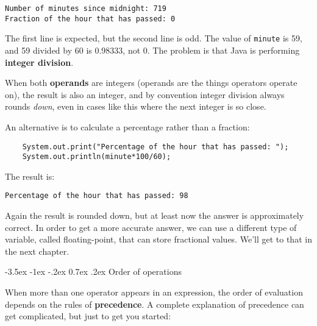 \documentclass{book}
\makeatletter
\renewcommand{\section}{\@startsection 
    {section} {1} {0mm}%
    {-3.5ex \@plus -1ex \@minus -.2ex}%
    {0.7ex \@plus.2ex}%
    {\normalfont\Large\bfseries}}
\makeatother
\begin{document}
\begin{verbatim}
Number of minutes since midnight: 719
Fraction of the hour that has passed: 0
\end{verbatim}
%
The first line is expected, but the second line is
odd.  The value of {\tt minute} is 59, and
59 divided by 60 is 0.98333, not 0.  The problem is that
Java is performing {\bf integer division}.


When both {\bf operands} are integers (operands are the things
operators operate on), the result is also an integer,
and by convention integer division always rounds {\em down},
even in cases like this where the next integer is so close.

An alternative is to calculate a percentage
rather than a fraction:

\begin{verbatim}
    System.out.print("Percentage of the hour that has passed: ");
    System.out.println(minute*100/60);
\end{verbatim}
%
The result is:

\begin{verbatim}
Percentage of the hour that has passed: 98
\end{verbatim}
%
Again the result is rounded down, but at least now the answer
is approximately correct.  In order to get a more accurate
answer, we can use a different type of variable, called
floating-point, that can store fractional values.
We'll get to that in the next chapter.


\section{Order of operations}

When more than one operator appears in an expression, the order
of evaluation depends on the rules of {\bf precedence}.  A
complete explanation of precedence can get complicated, but
just to get you started:
\end{document}
